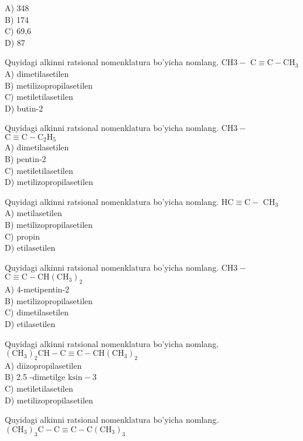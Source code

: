 A) 348\\
B) 174\\
C) 69,6\\
D) 87
  \item Quyidagi alkinni ratsional nomenklatura bo'yicha nomlang. $\mathrm{CH} 3-$ $\mathrm{C} \equiv \mathrm{C}-\mathrm{CH}_{3}$\\
A) dimetilasetilen\\
B) metilizopropilasetilen\\
C) metiletilasetilen\\
D) butin-2\\
  \item Quyidagi alkinni ratsional nomenklatura bo'yicha nomlang. $\mathrm{CH} 3-$ $\mathrm{C} \equiv \mathrm{C}-\mathrm{C}_{2} \mathrm{H}_{5}$\\
A) dimetilasetilen\\
B) pentin-2\\
C) metiletilasetilen\\
D) metilizopropilasetilen
  \item Quyidagi alkinni ratsional nomenklatura bo'yicha nomlang. $\mathrm{HC} \equiv \mathrm{C}-$ $\mathrm{CH}_{3}$\\
A) metilasetilen\\
B) metilizopropilasetilen\\
C) propin\\
D) etilasetilen
  \item Quyidagi alkinni ratsional nomenklatura bo'yicha nomlang. $\mathrm{CH} 3-$ $\mathrm{C} \equiv \mathrm{C}-\mathrm{CH}\left(\mathrm{CH}_{3}\right)_{2}$\\
A) 4-metipentin-2\\
B) metilizopropilasetilen\\
C) dimetilasetilen\\
D) etilasetilen
  \item Quyidagi alkinni ratsional nomenklatura bo'yicha nomlang.\\$\left(\mathrm{CH}_{3}\right)_{2} \mathrm{CH}-\mathrm{C} \equiv \mathrm{C}-\mathrm{CH}\left(\mathrm{CH}_{3}\right)_{2}$\\
A) diizopropilasetilen\\
B) 2.5 -dimetilge $\mathrm{ksin}-3$\\
C) metiletilasetilen\\
D) metilizopropilasetilen
  \item Quyidagi alkinni ratsional nomenklatura bo'yicha nomlang.\\
$\left(\mathrm{CH}_{3}\right)_{3} \mathrm{C}-\mathrm{C} \equiv \mathrm{C}-\mathrm{C}\left(\mathrm{CH}_{3}\right)_{3}$\\
